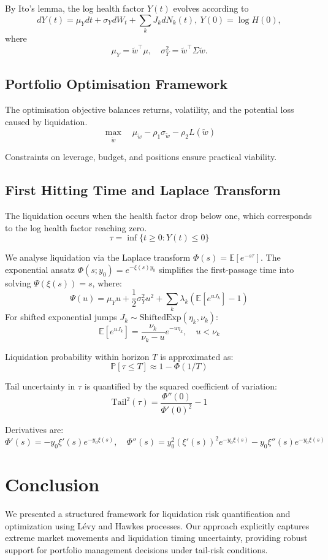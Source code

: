 \documentclass{article} %
\theoremstyle{plain}
\theoremstyle{definition} %
\begin{document}
By Ito's lemma, the log health factor $Y(t)$ evolves according to
\[
dY(t) = \mu_Y dt + \sigma_Y dW_t + \sum_k J_k dN_k(t), \ Y(0) = \log H(0),
\]
where
\[
\mu_Y = \tilde{w}^\top \mu, \quad \sigma_Y^2 = \tilde{w}^\top \Sigma \tilde{w}.
\]


\subsection{Portfolio Optimisation Framework}
The optimisation objective balances returns, volatility, and the potential loss caused by liquidation. 
\[
\max_{\tilde{w}} \quad \mu_{\tilde{w}} - \rho_1 \sigma_{\tilde{w}} - \rho_2 L(\tilde{w})
\]

Constraints on leverage, budget, and positions ensure practical viability.


\subsection{First Hitting Time and Laplace Transform}
The liquidation occurs when the health factor drop below one, which corresponds to the log health factor reaching zero. 
\[
\tau = \inf\{ t \geq 0 : Y(t) \leq 0 \}
\]

We analyse liquidation via the Laplace transform $\Phi(s) = \mathbb{E}[e^{-s\tau}]$. The exponential ansatz $\Phi(s; y_0) = e^{-\xi(s) y_0}$ simplifies the first-passage time into solving $\Psi(\xi(s)) = s$, where:
\[
\Psi(u) = \mu_Y u + \frac{1}{2}\sigma_Y^2 u^2 + \sum_k \lambda_k\left(\mathbb{E}[e^{u J_k}] - 1\right)
\]
For shifted exponential jumps $J_k \sim \text{ShiftedExp}(\eta_k, \nu_k)$:
\[
\mathbb{E}[e^{u J_k}] = \frac{\nu_k}{\nu_k - u}e^{-u\eta_k}, \quad u < \nu_k
\]

Liquidation probability within horizon $T$ is approximated as:
\[
\mathbb{P}[\tau \leq T] \approx 1 - \Phi(1/T)
\]

Tail uncertainty in $\tau$ is quantified by the squared coefficient of variation:
\[
\text{Tail}^2(\tau) = \frac{\Phi''(0)}{\Phi'(0)^2}-1
\]

Derivatives are:
\[
\Phi'(s) = -y_0 \xi'(s)e^{-y_0\xi(s)}, \quad \Phi''(s)=y_0^2(\xi'(s))^2e^{-y_0\xi(s)} - y_0\xi''(s)e^{-y_0\xi(s)}
\]


\section{Conclusion}
We presented a structured framework for liquidation risk quantification and optimization using Lévy and Hawkes processes. Our approach explicitly captures extreme market movements and liquidation timing uncertainty, providing robust support for portfolio management decisions under tail-risk conditions.
\end{document}
